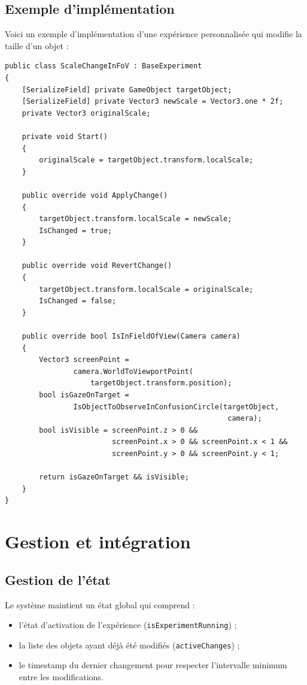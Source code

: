 \documentclass[12pt]{report}
\begin{document}
\subsection{Exemple d'implémentation}

Voici un exemple d'implémentation d'une expérience personnalisée qui modifie la taille d'un objet :
\vspace{2mm}

{\small
\lstset{style=sharpc}
\begin{lstlisting}
public class ScaleChangeInFoV : BaseExperiment
{
    [SerializeField] private GameObject targetObject;
    [SerializeField] private Vector3 newScale = Vector3.one * 2f;
    private Vector3 originalScale;
    
    private void Start()
    {
        originalScale = targetObject.transform.localScale;
    }
    
    public override void ApplyChange()
    {
        targetObject.transform.localScale = newScale;
        IsChanged = true;
    }
    
    public override void RevertChange()
    {
        targetObject.transform.localScale = originalScale;
        IsChanged = false;
    }
    
    public override bool IsInFieldOfView(Camera camera)
    {
        Vector3 screenPoint = 
                camera.WorldToViewportPoint(
                    targetObject.transform.position);
        bool isGazeOnTarget = 
                IsObjectToObserveInConfusionCircle(targetObject, 
                                                    camera);
        bool isVisible = screenPoint.z > 0 && 
                         screenPoint.x > 0 && screenPoint.x < 1 && 
                         screenPoint.y > 0 && screenPoint.y < 1;
        
        return isGazeOnTarget && isVisible;
    }
}
\end{lstlisting}
}

\section{Gestion et intégration}

\subsection{Gestion de l'état}
Le système maintient un état global qui comprend :
\begin{itemize}
    \item l'état d'activation de l'expérience (\texttt{isExperimentRunning}) ;
    \item la liste des objets ayant déjà été modifiés (\texttt{activeChanges}) ;
    \item le timestamp du dernier changement pour respecter l'intervalle minimum entre les modifications.
\end{itemize}
\end{document}
